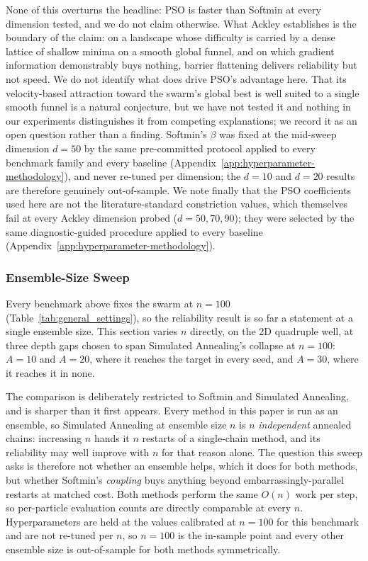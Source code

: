 \documentclass{article} %
\theoremstyle{plain}
\theoremstyle{definition}
\theoremstyle{remark}
\begin{document}
None of this overturns the headline: PSO is faster than Softmin at every dimension tested, and we do not claim otherwise. What Ackley establishes is the boundary of the claim: on a landscape whose difficulty is carried by a dense lattice of shallow minima on a smooth global funnel, and on which gradient information demonstrably buys nothing, barrier flattening delivers reliability but not speed. We do not identify what does drive PSO's advantage here. That its velocity-based attraction toward the swarm's global best is well suited to a single smooth funnel is a natural conjecture, but we have not tested it and nothing in our experiments distinguishes it from competing explanations; we record it as an open question rather than a finding. Softmin's $\beta$ was fixed at the mid-sweep dimension $d=50$ by the same pre-committed protocol applied to every benchmark family and every baseline (Appendix~\ref{app:hyperparameter-methodology}), and never re-tuned per dimension; the $d=10$ and $d=20$ results are therefore genuinely out-of-sample. We note finally that the PSO coefficients used here are not the literature-standard constriction values, which themselves fail at every Ackley dimension probed ($d=50,70,90$); they were selected by the same diagnostic-guided procedure applied to every baseline (Appendix~\ref{app:hyperparameter-methodology}).

\subsubsection{Ensemble-Size Sweep}
\label{apx:particle-sweep}

Every benchmark above fixes the swarm at $n=100$ (Table~\ref{tab:general_settings}), so the
reliability result is so far a statement at a single ensemble size. This section varies $n$
directly, on the 2D quadruple well, at three depth gaps chosen to span Simulated Annealing's
collapse at $n=100$: $A=10$ and $A=20$, where it reaches the target in every seed, and $A=30$,
where it reaches it in none.

The comparison is deliberately restricted to Softmin and Simulated Annealing, and is sharper than
it first appears. Every method in this paper is run as an ensemble, so Simulated Annealing at
ensemble size $n$ is $n$ \emph{independent} annealed chains: increasing $n$ hands it $n$ restarts
of a single-chain method, and its reliability may well improve with $n$ for that reason alone. The
question this sweep asks is therefore not whether an ensemble helps, which it does for both
methods, but whether Softmin's \emph{coupling} buys anything beyond embarrassingly-parallel
restarts at matched cost. Both methods perform the same $O(n)$ work per step, so per-particle
evaluation counts are directly comparable at every $n$. Hyperparameters are held at the values
calibrated at $n=100$ for this benchmark and are not re-tuned per $n$, so $n=100$ is the in-sample
point and every other ensemble size is out-of-sample for both methods symmetrically.
\end{document}
